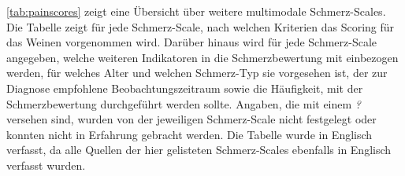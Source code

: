 \autoref{tab:painscores} zeigt eine Übersicht über weitere multimodale Schmerz-Scales. Die Tabelle zeigt für jede Schmerz-Scale, nach welchen Kriterien das Scoring für das Weinen vorgenommen wird. Darüber hinaus wird für jede Schmerz-Scale angegeben, welche weiteren Indikatoren in die Schmerzbewertung mit einbezogen werden, für welches Alter und welchen Schmerz-Typ sie vorgesehen ist, der zur Diagnose empfohlene Beobachtungszeitraum sowie die Häufigkeit, mit der Schmerzbewertung durchgeführt werden sollte. Angaben, die mit einem \emph{?} versehen sind, wurden von der jeweiligen Schmerz-Scale nicht festgelegt oder konnten nicht in Erfahrung gebracht werden. Die Tabelle wurde in Englisch verfasst, da alle Quellen der hier gelisteten Schmerz-Scales ebenfalls in Englisch verfasst wurden.
\pagebreak

\vspace{-3mm}
\footnotesize

